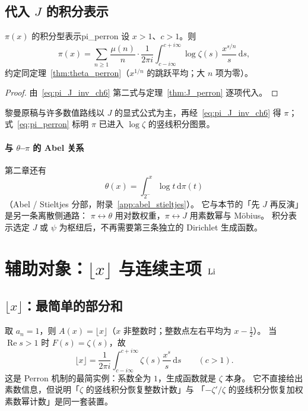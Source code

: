 \subsection{代入 $J$ 的积分表示}

\begin{theorem}{$\pi(x)$ 的积分型表示}{pi_perron}
设 $x>1$、$c>1$。则
\begin{equation}
  \pi(x)
  =\sum_{n\ge 1}\frac{\mu(n)}{n}\cdot
  \frac{1}{2\pi i}
  \int_{c-i\infty}^{c+i\infty}
  \log\zeta(s)\,\frac{x^{s/n}}{s}\,\mathrm{d}s,
  \label{eq:pi_perron}
\end{equation}
约定同定理~\ref{thm:theta_perron}（$x^{1/n}$ 的跳跃平均；大 $n$ 项为零）。
\end{theorem}

\begin{proof}
由~\eqref{eq:pi_J_inv_ch6} 第二式与定理~\ref{thm:J_perron} 逐项代入。
\end{proof}

黎曼原稿与许多数值路线以 $J$ 的显式公式为主，再经~\eqref{eq:pi_J_inv_ch6} 得 $\pi$；
式~\eqref{eq:pi_perron} 标明 $\pi$ 已进入 $\log\zeta$ 的竖线积分图景。

\paragraph{与 $\theta$--$\pi$ 的 Abel 关系}
第二章还有
\[
  \theta(x)=\int_{2^-}^{x}\log t\,\mathrm{d}\pi(t)
\]
（Abel / Stieltjes 分部，附录~\ref{app:abel_stieltjes}）。
它与本节的「先 $J$ 再反演」是另一条离散侧通路：
$\pi\leftrightarrow\theta$ 用对数权重，$\pi\leftrightarrow J$ 用素数幂与 Möbius。
积分表示选定 $J$ 或 $\psi$ 为枢纽后，不再需要第三条独立的 Dirichlet 生成函数。


\section{辅助对象：\texorpdfstring{$\lfloor x\rfloor$}{floor(x)} 与连续主项 \texorpdfstring{$\operatorname{Li}$}{Li}}
\label{sec:floor_and_Li}

\subsection{$\lfloor x\rfloor$：最简单的部分和}

取 $a_n=1$，则 $A(x)=\lfloor x\rfloor$（$x$ 非整数时；整数点左右平均为 $x-\tfrac12$）。
当 $\operatorname{Re}s>1$ 时 $F(s)=\zeta(s)$，故
\begin{equation}
  \lfloor x\rfloor
  =\frac{1}{2\pi i}
  \int_{c-i\infty}^{c+i\infty}
  \zeta(s)\frac{x^s}{s}\,\mathrm{d}s
  \qquad(c>1).
  \label{eq:floor_perron}
\end{equation}
这是 Perron 机制的最简实例：系数全为 $1$，生成函数就是 $\zeta$ 本身。
它不直接给出素数信息，但说明「$\zeta$ 的竖线积分恢复整数计数」与
「$-\zeta'/\zeta$ 的竖线积分恢复加权素数幂计数」是同一套装置。

